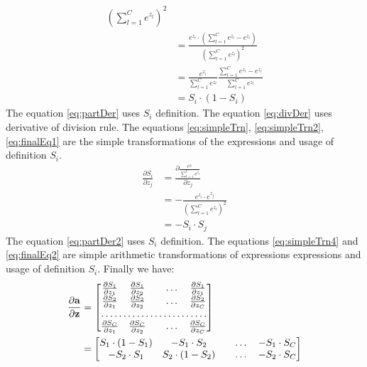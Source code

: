 \documentclass[10pt,a4paper]{article}
\begin{document}
\begin{enumerate}
\begin{align}
{\left(\sum_{l=1}^{C}e^{z_{l}}\right)^2}
\label{eq:divDer}\\
&= \frac{e^{z_{i}} \cdot \left(\sum_{l=1}^{C}e^{z_{l}} -  e^{z_{i}}\right)}
{\left(\sum_{l=1}^{C}e^{z_{l}}\right)^2}
\label{eq:simpleTrn}\\
&= \frac{e^{z_{i}}}{\sum_{l=1}^{C}e^{z_{l}}}\frac{ \sum_{l=1}^{C}e^{z_{l}} -  e^{z_{i}}}
{\sum_{l=1}^{C}e^{z_{l}}}
\label{eq:simpleTrn2}\\
&= S_i \cdot (1 - S_i) \label{eq:finalEq1}
\end{align}
The equation \ref{eq:partDer} uses $S_i$ definition. The equation \ref{eq:divDer} uses derivative of division rule. The equations \ref{eq:simpleTrn}, \ref{eq:simpleTrn2}, \ref{eq:finalEq1} are the simple transformations of the expressions and usage of definition $S_i$.
\begin{align}
\frac{\partial S_i}{\partial z_j} &= 
\frac{\partial \frac{ e^{z_{i}}}{\sum_{l=1}^{C}e^{z_{l}}}}{\partial z_j}
\label{eq:partDer2}\\
&=-\frac{e^{z_{i}}\cdot e^{z_{j}}}{\left(\sum_{l=1}^{C}e^{z_{l}}\right)^2} \label{eq:simpleTrn4}\\
&= -S_i \cdot S_j \label{eq:finalEq2}
\end{align}
The equation \ref{eq:partDer2} uses $S_i$ definition.
The equations \ref{eq:simpleTrn4} and \ref{eq:finalEq2} are simple arithmetic transformations of expressions expressions and usage of definition $S_i$.
Finally  we have:
\begin{align}
\frac{\partial \vect{a}}{\partial \vect{z}}  &=
\begin{bmatrix}
    \frac{\partial S_1}{\partial z_1}     & 
    \frac{\partial S_1}{\partial z_2}      &  & \dots & \frac{\partial S_1}{\partial z_1}  \\
    \frac{\partial S_2}{\partial z_1}     & 
    \frac{\partial S_2}{\partial z_2}      &  & \dots & \frac{\partial S_2}{\partial z_C}\\
    \hdotsfor{5} \\
    \frac{\partial S_C}{\partial z_1}     & 
    \frac{\partial S_C}{\partial z_2}      &  & \dots & \frac{\partial S_C}{\partial z_C}\\
\end{bmatrix} \nonumber \\
&=
\begin{bmatrix}
    S_1 \cdot (1- S_1)    & 
-S_1 \cdot S_2      &  & \dots & -S_1\cdot S_C \\
- S_2 \cdot S_1    & 
S_2 \cdot (1 - S_2)      &  & \dots & -S_2 \cdot S_C \\

\end{bmatrix}
\end{align}
\end{enumerate}
\end{document}
